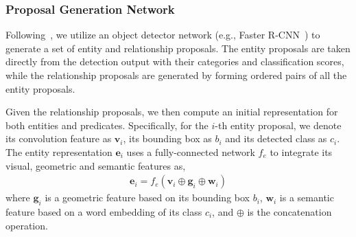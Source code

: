 


\subsubsection{Proposal Generation Network}
\label{subsec:proposal}

Following~\cite{zellers_neural_2017, zhang_graphical_2019}, we utilize an object detector network (e.g., Faster R-CNN~\cite{ren_faster_2015}) to generate a set of entity and relationship proposals. 
The entity proposals are taken directly from the detection output with their categories and classification scores, while the relationship proposals are generated by forming ordered pairs of all the entity proposals.

Given the relationship proposals, we then compute an initial representation for both entities and predicates. Specifically, for the $i$-th entity proposal, we denote its convolution feature as $\mathbf{v}_i$, its bounding box as $b_i$ and its detected class as $c_i$. The entity representation $\mathbf{e}_i$ uses a fully-connected network $f_e$ to integrate its visual, geometric and semantic features as,   
\begin{align}
    \mathbf{e}_i = f_e(\mathbf{v}_i\oplus \mathbf{g}_i\oplus \mathbf{w}_i)
\end{align}
where $\mathbf{g}_i$ is a geometric feature based on its bounding box $b_i$, $\mathbf{w}_i$ is a semantic feature based on a word embedding of its class $c_i$, and $\oplus$ is the concatenation operation. 

